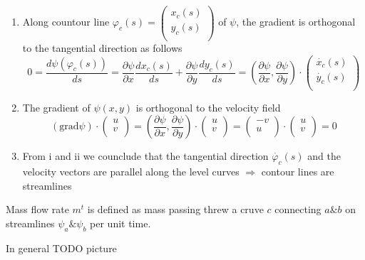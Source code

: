    \begin{enumerate}[label=\roman*]
\item Along countour line $\varphi_c(s) = \begin{pmatrix} x_c(s) \\ y_c(s) \\ \end{pmatrix}$ of $\psi$, the gradient is orthogonal to the tangential direction as follows
\[ 0 = \frac{d \psi( \varphi_c(s))}{d s} = \frac{\partial \psi}{\partial x} \frac{d x_c(s)}{d s} + \frac{\partial \psi}{\partial y} \frac{d y_c(s)}{d s} = \left( \frac{\partial \psi}{\partial x} , \frac{\partial \psi}{\partial y}\right) \cdot \begin{pmatrix} \dot{x_c}(s) \\ \dot{y_c}(s) \\ \end{pmatrix} \]

\item The gradient of $\psi(x,y)$ is orthogonal to the velocity field
\[ (\text{grad} \psi) \cdot \begin{pmatrix} u \\ v \\ \end{pmatrix} = \left( \frac{\partial \psi}{\partial x} , \frac{\partial \psi}{\partial y}\right) \cdot \begin{pmatrix} u \\ v \\ \end{pmatrix} = \begin{pmatrix} -v \\ u \\ \end{pmatrix} \cdot \begin{pmatrix} u \\ v \\ \end{pmatrix} = 0 \]

\item From i and ii we counclude that the tangential direction $\dot{\varphi_c}(s)$ and the velocity vectors are parallel along the level curves $\Rightarrow$ contour lines are streamlines
\end{enumerate}
 Mass flow rate $m^t$ is defined as mass passing threw a cruve $c$ connecting $a \& b$ on streamlines $\psi_a \& \psi_b$ per unit time.

In general TODO picture \\

